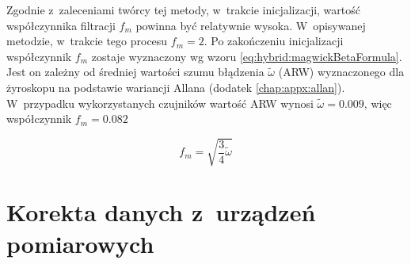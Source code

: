 Zgodnie z~zaleceniami twórcy tej metody, w~trakcie inicjalizacji, wartość współczynnika filtracji $f_m$ powinna być relatywnie wysoka. W~opisywanej metodzie, w~trakcie tego procesu $f_m = 2$. Po zakończeniu inicjalizacji współczynnik $f_m$ zostaje wyznaczony wg wzoru \ref{eq:hybrid:magwickBetaFormula}. Jest on zależny od średniej wartości szumu błądzenia $\widetilde{\omega}$ (ARW) wyznaczonego dla żyroskopu na podstawie wariancji Allana (dodatek \ref{chap:appx:allan}). W~przypadku wykorzystanych czujników wartość ARW wynosi $\widetilde{\omega} = 0.009$, więc współczynnik $f_m = 0.082$

\begin{equation}
	f_m = \sqrt{\frac{3}{4}\widetilde{\omega}}
	\label{eq:hybrid:magwickBetaFormula}
\end{equation}

\section{Korekta danych z~urządzeń pomiarowych}

